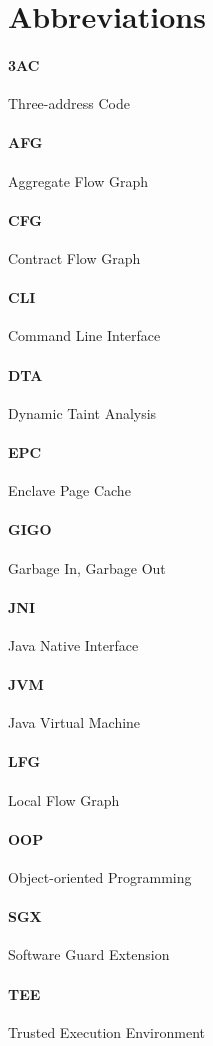 \section{Abbreviations}
\paragraph{3AC} Three-address Code
\paragraph{AFG} Aggregate Flow Graph
\paragraph{CFG} Contract Flow Graph
\paragraph{CLI} Command Line Interface
\paragraph{DTA} Dynamic Taint Analysis
\paragraph{EPC} Enclave Page Cache
\paragraph{GIGO} Garbage In, Garbage Out
\paragraph{JNI} Java Native Interface
\paragraph{JVM} Java Virtual Machine
\paragraph{LFG} Local Flow Graph
\paragraph{OOP} Object-oriented Programming
\paragraph{SGX} Software Guard Extension
\paragraph{TEE} Trusted Execution Environment
